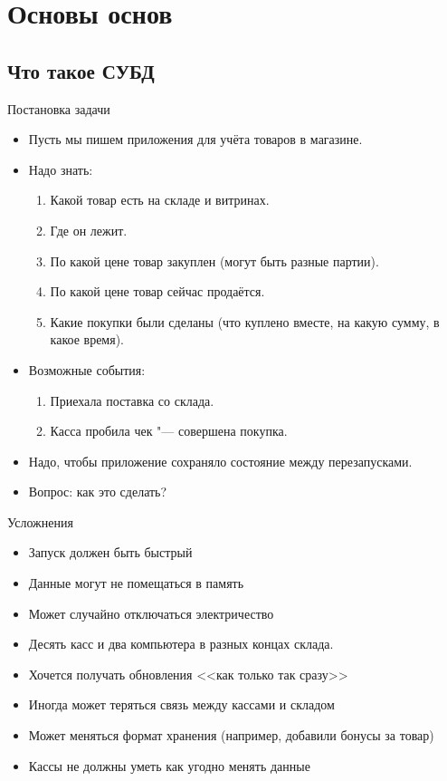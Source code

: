 \section{Основы основ}
\subsection{Что такое СУБД}

\begin{frame}
\end{frame}

\begin{frame}{Постановка задачи}
	\begin{itemize}
		\item Пусть мы пишем приложения для учёта товаров в магазине.
		\item Надо знать:
			\begin{enumerate}
				\item Какой товар есть на складе и витринах.
				\item Где он лежит.
				\item По какой цене товар закуплен (могут быть разные партии).
				\item По какой цене товар сейчас продаётся.
				\item Какие покупки были сделаны (что куплено вместе, на какую сумму, в какое время).
			\end{enumerate}
		\item Возможные события:
			\begin{enumerate}
				\item Приехала поставка со склада.
				\item Касса пробила чек "--- совершена покупка.
			\end{enumerate}
		\item Надо, чтобы приложение сохраняло состояние между перезапусками.
		\item Вопрос: как это сделать?
	\end{itemize}
\end{frame}

\begin{frame}{Усложнения}
	\begin{itemize}
		\item Запуск должен быть быстрый
		\item Данные могут не помещаться в память
		\item Может случайно отключаться электричество
		\item Десять касс и два компьютера в разных концах склада.
		\item Хочется получать обновления <<как только так сразу>>
		\item Иногда может теряться связь между кассами и складом
		\item Может меняться формат хранения (например, добавили бонусы за товар)
		\item Кассы не должны уметь как угодно менять данные
	\end{itemize}
\end{frame}

